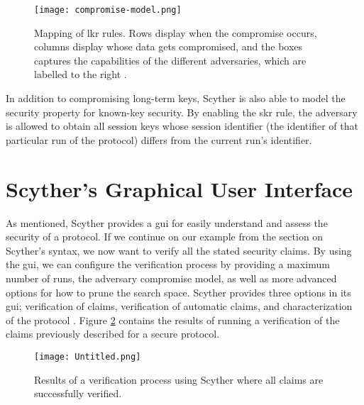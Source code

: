 \begin{figure}
	\centering
	\texttt{[image: compromise-model.png]}
	\caption{Mapping of \gls{lkr} rules. Rows display when the compromise occurs, columns display whose data gets compromised, and the boxes captures the capabilities of the different adversaries, which are labelled to the right \cite{basin2010modeling}.}
	\label{fig:compromise-model}
\end{figure}


In addition to compromising long-term keys, Scyther is also able to model the security property for known-key security. By enabling the \gls{skr} rule, the adversary is allowed to obtain all session keys whose session identifier (the identifier of that particular run of the protocol) differs from the current run's identifier.


\section{Scyther's Graphical User Interface}

As mentioned, Scyther provides a \gls{gui} for easily understand and assess the security of a protocol. 
If we continue on our example from the section on Scyther's syntax, we now want to verify all the stated security claims. By using the \gls{gui}, we can configure the verification process by providing a maximum number of runs, the adversary compromise model, as well as more advanced options for how to prune the search space. Scyther provides three options in its \gls{gui}; verification of claims, verification of automatic claims, and characterization of the protocol \cite{cremers2008scyther}. Figure \ref{fig:scyther-verify-claims} contains the results of running a verification of the claims previously described for a secure protocol.

\begin{figure}[h]
	\centering
	\texttt{[image: Untitled.png]}
	\caption{Results of a verification process using Scyther where all claims are successfully verified.}
	\label{fig:scyther-verify-claims}
\end{figure}

